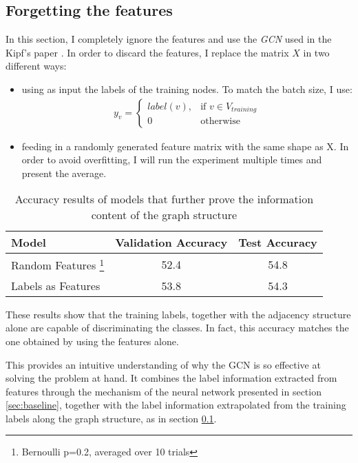 \documentclass[10pt,a4]{article}
\begin{document}
    \subsection{Forgetting the features}
    \label{sec:labels}
    In this section, I completely ignore the features and use the \emph{GCN}
    used in the Kipf's paper \cite{kipf2016semi}. In order to discard the features, 
    I replace the matrix $X$ in two different ways: 
        \begin{itemize}
            \item using as input the labels of the training nodes. To match the 
        batch size, I use:
            \begin{align*}
                y_v = 
                \begin{cases}
                    label(v), & \text{if } v \in V_{training} \\ 
                    0         & \text{otherwise} 
                \end{cases}
            \end{align*}
            \item feeding in a randomly generated feature matrix with the same 
        shape as X. In order to avoid overfitting, I will run the experiment 
        multiple times and present the average. 
        
        \end{itemize}
        
    \begin{table}
        \centering
        \begin{tabular}{l c c}
            \textbf{Model} & \textbf{Validation Accuracy} & \textbf{Test Accuracy} \\
            \hline 
            Random Features \footnote{Bernoulli p=0.2, averaged over 10 trials} & 52.4 & 54.8 \\
            Labels as Features & 53.8 & 54.3  
        \end{tabular}
        \caption{Accuracy results of models that further prove the information 
        content of the graph structure}
    \end{table}

    These results show that the training labels, together with the adjacency structure 
    alone are capable of discriminating the classes. In fact, this accuracy matches
    the one obtained by using the features alone.

    This provides an intuitive understanding of why the GCN is so effective 
    at solving the problem at hand. It combines the label information extracted 
    from features through the mechanism of the neural network presented 
    in section \ref{sec:baseline}, together with the label information 
    extrapolated from the training labels along the graph structure, as in 
    section \ref{sec:labels}.
\end{document}
